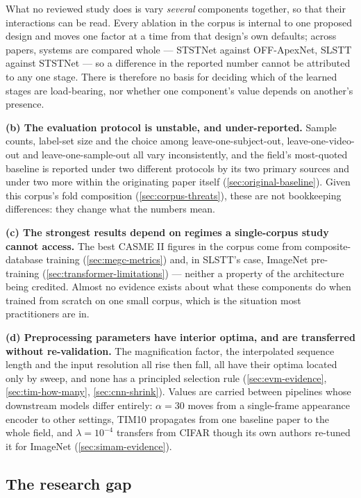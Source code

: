 What no reviewed study does is vary \textit{several} components together, so that their interactions can be read. Every ablation in the corpus is internal to one proposed design and moves one factor at a time from that design's own defaults; across papers, systems are compared whole --- STSTNet against OFF-ApexNet, SLSTT against STSTNet --- so a difference in the reported number cannot be attributed to any one stage. There is therefore no basis for deciding which of the learned stages are load-bearing, nor whether one component's value depends on another's presence.

\textbf{(b) The evaluation protocol is unstable, and under-reported.} Sample counts, label-set size and the choice among leave-one-subject-out, leave-one-video-out and leave-one-sample-out all vary inconsistently, and the field's most-quoted baseline is reported under two different protocols by its two primary sources and under two more within the originating paper itself (\autoref{sec:original-baseline}). Given this corpus's fold composition (\autoref{sec:corpus-threats}), these are not bookkeeping differences: they change what the numbers mean.

\textbf{(c) The strongest results depend on regimes a single-corpus study cannot access.} The best CASME II figures in the corpus come from composite-database training (\autoref{sec:megc-metrics}) and, in SLSTT's case, ImageNet pre-training (\autoref{sec:transformer-limitations}) --- neither a property of the architecture being credited. Almost no evidence exists about what these components do when trained from scratch on one small corpus, which is the situation most practitioners are in.

\textbf{(d) Preprocessing parameters have interior optima, and are transferred without re-validation.} The magnification factor, the interpolated sequence length and the input resolution all rise then fall, all have their optima located only by sweep, and none has a principled selection rule (\autoref{sec:evm-evidence}, \autoref{sec:tim-how-many}, \autoref{sec:cnn-shrink}). Values are carried between pipelines whose downstream models differ entirely: $\alpha = 30$ moves from a single-frame appearance encoder to other settings, TIM10 propagates from one baseline paper to the whole field, and $\lambda = 10^{-4}$ transfers from CIFAR though its own authors re-tuned it for ImageNet (\autoref{sec:simam-evidence}).

\subsection{The research gap}
\label{sec:research-gap}

